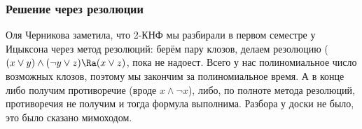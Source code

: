 \subsubsection{Решение через резолюции}
	Оля Черникова заметила, что 2-КНФ мы разбирали в первом семестре у Ицыксона через метод резолюций:
	берём пару клозов, делаем резолюцию ($(x \lor y) \land (\lnot y \lor z) \Ra (x \lor z)$, пока не надоест.
	Всего у нас полиномиальное число возможных клозов, поэтому мы закончим за полиномиальное время.
	А в конце либо получим противоречие (вроде $x \land \lnot x$), либо, по полноте метода резолюций,
	противоречия не получим и тогда формула выполнима.
	Разбора у доски не было, это было сказано мимоходом.
